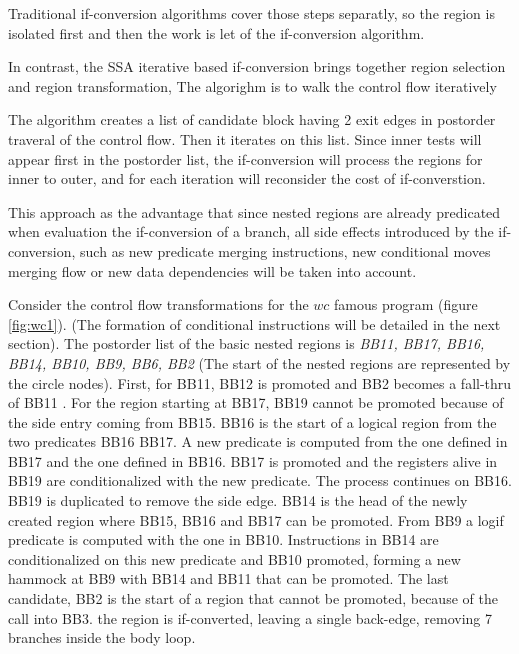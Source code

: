 Traditional if-conversion algorithms \cite{Schlansker-predicated} cover those steps separatly, so the region is isolated first and then the work is let of the if-conversion algorithm.

In contrast, the SSA iterative based if-conversion  brings together region selection and region transformation, The algorighm is to walk the control flow iteratively 

The algorithm creates a list of candidate block having 2 exit edges in postorder traveral of the control flow. Then it iterates on this list. Since inner tests will appear first in the postorder list, the if-conversion will process the regions for inner to outer, and for each iteration will reconsider the cost of if-converstion. 

This approach as the advantage that since nested regions are already predicated when evaluation the if-conversion of a branch, all side effects introduced by the if-conversion, such as new predicate merging instructions, new conditional moves merging flow or new data dependencies will be taken into account.

Consider the control flow transformations for the $wc$ famous program (figure \ref{fig:wc1}).
(The formation of conditional instructions will be detailed in the next section).
 The postorder list of the basic nested regions is {\em BB11, BB17, BB16, BB14, BB10, BB9, BB6, BB2} (The start of the nested regions are represented by the circle nodes). First, for BB11, BB12 is promoted and BB2 becomes a fall-thru of BB11 . For the region starting at BB17, BB19 cannot be promoted because of the side entry coming from BB15. BB16 is the start of a logical region from the two predicates BB16 BB17. A new predicate is computed from the one defined in BB17 and the one defined in BB16. BB17 is promoted and the registers alive in BB19 are conditionalized with the new predicate. The process continues on BB16. BB19 is duplicated to remove the side edge. BB14 is the head of the newly created region where BB15, BB16 and BB17 can be promoted. From BB9 a logif predicate is computed with the one in BB10. Instructions in BB14 are conditionalized on this new predicate and BB10 promoted, forming a new hammock at BB9 with BB14 and BB11 that can be promoted. The last candidate, BB2 is the start of a region that cannot be promoted, because of the call into BB3. the region is if-converted, leaving a single back-edge, removing 7 branches inside the body loop.

